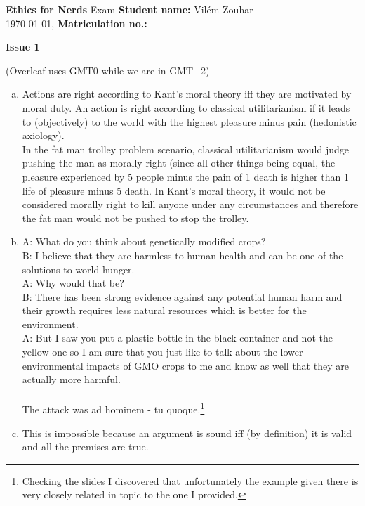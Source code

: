 \documentclass[a4paper, 11pt]{article}
\newcommand{\stdn}{} \newcommand{\studentname}[1]{\renewcommand{\stdn}{#1}}
\newcommand{\mtrk}{} \newcommand{\matriculationno}[1]{\renewcommand{\mtrk}{#1}}
\newcommand{\isnr}{} \newcommand{\issuenumber}[1]{\renewcommand{\isnr}{#1}}
\newcommand{\makeheader}{\textbf{Ethics for Nerds} Exam \hfill \textbf{Student name:} \stdn \\ \today, \currenttime \hfill \textbf{Matriculation no.:} \mtrk \par \textbf{\Large Issue \isnr}}
\begin{document}
\sffamily


\studentname{Vilém Zouhar} %
\matriculationno{} %
\issuenumber{1} %
\makeheader %


(Overleaf uses GMT0 while we are in GMT+2)

\begin{enumerate}[(a)]
	\item
	Actions are right according to Kant's moral theory iff they are motivated by moral duty.
	An action is right according to classical utilitarianism if it leads to (objectively) to the world with the highest pleasure minus pain (hedonistic axiology). \\
	In the fat man trolley problem scenario, classical utilitarianism would judge pushing the man as morally right (since all other things being equal, the pleasure experienced by 5 people minus the pain of 1 death is higher than 1 life of pleasure minus 5 death. In Kant's moral theory, it would not be considered morally right to kill anyone under any circumstances and therefore the fat man would not be pushed to stop the trolley.
	
	\item
	A: What do you think about genetically modified crops?\\
	B: I believe that they are harmless to human health and can be one of the solutions to world hunger.\\
	A: Why would that be?\\
	B: There has been strong evidence against any potential human harm and their growth requires less natural resources which is better for the environment.\\
	A: But I saw you put a plastic bottle in the black container and not the yellow one so I am sure that you just like to talk about the lower environmental impacts of GMO crops to me and know as well that they are actually more harmful.\\ \\
	The attack was ad hominem - tu quoque.\footnote{Checking the slides I discovered that unfortunately the example given there is very closely related in topic to the one I provided.}
	
	\item
	This is impossible because an argument is sound iff (by definition) it is valid and all the premises are true.
	

\end{enumerate}
\end{document}
